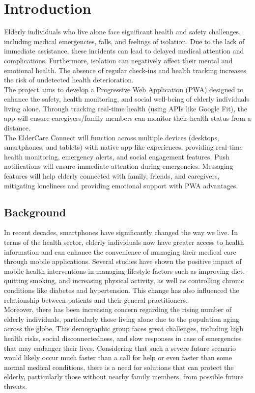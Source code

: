 \chapter{Introduction}
Elderly individuals who live alone face significant health and safety challenges, including medical emergencies, falls, and feelings of isolation. Due to the lack of immediate assistance, these incidents can lead to delayed medical attention and complications. Furthermore, isolation can negatively affect their mental and emotional health. The absence of regular check-ins and health tracking increases the risk of undetected health deterioration.\\

The project aims to develop a Progressive Web Application (PWA) designed to enhance the safety, health monitoring, and social well-being of elderly individuals living alone. Through tracking real-time health (using APIs like Google Fit), the app will ensure caregivers/family members can monitor their health status from a distance.\\

The ElderCare Connect will function across multiple devices (desktops, smartphones, and tablets) with native app-like experiences, providing real-time health monitoring, emergency alerts, and social engagement features. Push notifications will ensure immediate attention during emergencies. Messaging features will help elderly connected with family, friends, and caregivers, mitigating loneliness and providing emotional support with PWA advantages. 
\section{Background}

In recent decades, smartphones have significantly changed the way we live. In terms of the health sector, elderly individuals now have greater access to health information and can enhance the convenience of managing their medical care through mobile applications. Several studies have shown the positive impact of mobile health interventions in managing lifestyle factors such as improving diet, quitting smoking, and increasing physical activity, as well as controlling chronic conditions like diabetes and hypertension. This change has also influenced the relationship between patients and their general practitioners.\\

Moreover, there has been increasing concern regarding the rising number of elderly individuals, particularly those living alone due to the population aging across the globe. This demographic group faces great challenges, including high health risks, social disconnectedness, and slow responses in case of emergencies that may endanger their lives. Considering that such a severe future scenario would likely occur much faster than a call for help or even faster than some normal medical conditions, there is a need for solutions that can protect the elderly, particularly those without nearby family members, from possible future threats.
